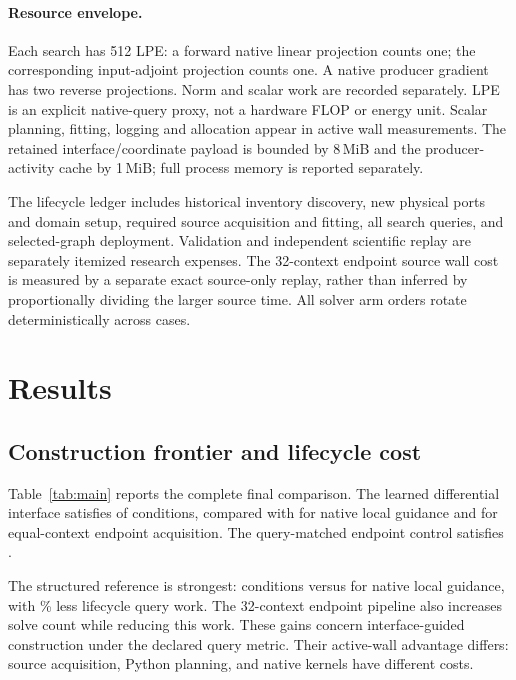 \documentclass[11pt]{article}
\begin{document}
\paragraph{Resource envelope.}
Each search has 512 LPE: a forward native linear projection counts one;
the corresponding input-adjoint projection counts one. A native producer
gradient has two reverse projections. Norm and scalar work are recorded
separately. LPE is an explicit native-query proxy, not a hardware FLOP or
energy unit. Scalar planning, fitting, logging and allocation appear in active
wall measurements. The retained interface/coordinate payload is bounded by
8\,MiB and the producer-activity cache by 1\,MiB; full process memory is
reported separately.

The lifecycle ledger includes historical inventory discovery, new physical
ports and domain setup, required source acquisition and fitting, all search
queries, and selected-graph deployment. Validation and independent scientific
replay are separately itemized research expenses. The 32-context endpoint source wall
cost is measured by a separate exact source-only replay, rather than inferred
by proportionally dividing the larger source time. All solver arm orders
rotate deterministically across cases.

\section{Results}
\subsection{Construction frontier and lifecycle cost}
Table~\ref{tab:main} reports the complete final comparison. The learned
differential interface satisfies \DifferentialSolved{} of \TestConditions{}
conditions, compared with \NativeSolved{} for native local guidance and
\ValueFewSolved{} for equal-context endpoint acquisition. The query-matched
endpoint control satisfies \ValueMatchedSolved{}.

\begin{table}[t]
\centering\small

\caption{Final comparison. Source LPE excludes common inventory/port work;
lifecycle LPE includes it, source acquisition, search and all selected-graph
deployment. Active wall includes measured source fitting and CPU planning.
All rows use the same online envelope and native quality checker.}
\label{tab:main}
\end{table}

The structured reference is strongest: \StructuredSolved{} conditions versus
\NativeSolved{} for native local guidance, with \StructuredSaving{}\% less
lifecycle query work. The 32-context endpoint pipeline also increases solve count while
reducing this work. These gains concern interface-guided construction under the
declared query metric. Their active-wall advantage differs: source acquisition,
Python planning, and native kernels have different costs.
\end{document}
